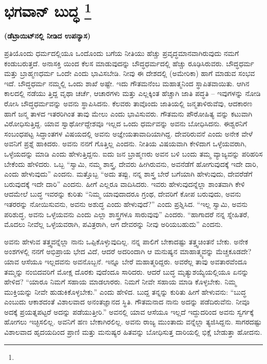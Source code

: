 
\chapter[ಭಗವಾನ್ ಬುದ್ಧ ]{ಭಗವಾನ್ ಬುದ್ಧ \protect\footnote{}}

\centerline{\textbf{(ಡೆಟ್ರಾಯಿಟ್​ನಲ್ಲಿ ನೀಡಿದ ಉಪನ್ಯಾಸ)}}

ಪ್ರತಿಯೊಂದು ಧರ್ಮದಲ್ಲಿಯೂ ಒಂದೊಂದು ಬಗೆಯ ನೀತಿಯು ಹೆಚ್ಚು ಪ್ರವೃದ್ಧಮಾನವಾಗಿರುವುದು ನಮಗೆ ಕಂಡುಬರುತ್ತದೆ. ಅನಾಸಕ್ತಿ ಯಿಂದ ಕೆಲಸ ಮಾಡುವುದನ್ನು ಬೌದ್ಧಧರ್ಮದಲ್ಲಿ ಹೆಚ್ಚು ರೂಢಿಸಿರುವರು. ಬೌದ್ಧಧರ್ಮ ಮತ್ತು ಬ್ರಾಹ್ಮಣಧರ್ಮ ಒಂದೇ ಎಂದು ಭಾವಿಸಬೇಡಿ. ನೀವು ಈ ದೇಶದಲ್ಲಿ (ಅಮೇರಿಕಾ) ಹಾಗೆ ಮಾಡುವ ಸಂಭವ ಇದೆ. ಬೌದ್ಧಧರ್ಮ ನಮ್ಮಲ್ಲಿ ಒಂದು ಶಾಖೆ ಅಷ್ಟೇ. ಇದು ಗೌತಮನೆಂಬ ಮಹಾತ್ಮನಿಂದ ಸ್ಥಾಪಿತವಾಯಿತು. ಆಗಿನ ಕಾಲದಲ್ಲಿ ನಡೆಯು ತ್ತಿದ್ದ ವೃಥಾ ಚರ್ಚೆ, ಆಚಾರಗಳು ಮತ್ತು ಎಲ್ಲಕ್ಕಿಂತ ಹೆಚ್ಚಾಗಿ ಜಾತಿ ಪದ್ಧತಿ – ಇವುಗಳನ್ನು ನೋಡಿ ರೋಸಿ ಬೌದ್ಧಧರ್ಮವನ್ನು ಅವನು ಸ್ಥಾಪಿಸಿದನು. ಕೆಲವರು ತಾವೊಂದು ಜಾತಿಯಲ್ಲಿ ಜನ್ಮತಾಳಿರುವೆವು, ಆದಕಾರಣ ಹಾಗೆ ಜನ್ಮ ತಾಳದ ಇತರರಿಗಿಂತ ತಾವು ಮೇಲು ಎಂದು ಭಾವಿಸುವರು. ಗೌತಮನು ಪೌರೋಹಿತ್ಯ ವನ್ನು ಕಟುವಾಗಿ ವಿರೋಧಿಸುತ್ತಿದ್ದ. ಯಾವ ಸ್ವಾರ್ಥೋದ್ದೇಶವೂ ಇಲ್ಲದ ಒಂದು ಧರ್ಮವನ್ನು ಅವನು ಬೋಧಿಸಿದನು. ಈಶ್ವರನಿಗೆ ಸಂಬಂಧಪಟ್ಟ ಸಿದ್ಧಾಂತಗಳ ವಿಷಯದಲ್ಲಿ ಅವನು ಅಜ್ಞೇಯತಾವಾದಿಯಾಗಿದ್ದ. ದೇವರಿರುವನೆ ಎಂದು ಅನೇಕ ವೇಳೆ ಅವನಿಗೆ ಪ್ರಶ್ನೆ ಹಾಕಿದರು. ಅವನು ನನಗೆ ಗೊತ್ತಿಲ್ಲ ಎಂದನು. ನೀತಿಯ ವಿಷಯವಾಗಿ ಕೇಳಿದಾಗ ಒಳ್ಳೆಯವರಾಗಿ, ಒಳ್ಳೆಯದನ್ನು ಮಾಡಿ ಎಂದು ಹೇಳುತ್ತಿದ್ದನು. ಐದು ಜನ ಬ್ರಾಹ್ಮಣರು ಅವನ ಬಳಿ ಬಂದು ತಮ್ಮ ವ್ಯಾಜ್ಯವನ್ನು ಪರಿಹರಿಸ ಬೇಕೆಂದು ಹೇಳಿದರು. ಒಬ್ಬ “ಸ್ವಾಮಿ, ನಮ್ಮ ಶಾಸ್ತ್ರ, ದೇವರು ಹೀಗಿರುವನು, ಅವನೆಡೆಗೆ ಹೋಗುವುದಕ್ಕೆ ಇದೇ ದಾರಿ, ಎಂದು ಹೇಳುವುದು” ಎಂದನು. ಮತ್ತೊಬ್ಬ “ಅದು ತಪ್ಪು, ನನ್ನ ಶಾಸ್ತ್ರ ಬೇರೆ ಬಗೆಯಾಗಿ ಹೇಳುವುದು, ದೇವರೆಡೆಗೆ ಬರುವುದಕ್ಕೆ ಇದೇ ದಾರಿ” ಎಂದನು. ಹೀಗೆ ಎಲ್ಲರೂ ವಾದಿಸಿದರು. ಇವರು ಹೇಳುವುದನ್ನೆಲ್ಲಾ ಶಾಂತವಾಗಿ ಕೇಳಿ ಆದಮೇಲೆ ಬುದ್ಧ ಇವರನ್ನು ಕುರಿತು “ನಿಮ್ಮ ಯಾವುದಾದರೂ ಗ್ರಂಥ, ದೇವರಿಗೆ ಕೋಪ ಬರುವುದು, ಅವನು ಇತರರನ್ನು ನೋಯಿಸುವನು, ಅವನು ಅಶುದ್ಧ ಎಂದು ಹೇಳುವುದೆ?” ಎಂದು ಪ್ರಶ್ನಿಸಿದ. “ಇಲ್ಲ ಸ್ವಾಮಿ, ಅವನು ಪರಿಶುದ್ಧ, ಅವನು ಒಳ್ಳೆಯವನು ಎಂದು ಎಲ್ಲಾ ಶಾಸ್ತ್ರಗಳೂ ಸಾರುವುವು” ಎಂದರು. “ಹಾಗಾದರೆ ನನ್ನ ಸ್ನೇಹಿತರೆ, ಮೊದಲು ನೀವೆಲ್ಲ ಒಳ್ಳೆಯವರಾಗಿ, ಪವಿತ್ರರಾಗಿ, ಆಗ ದೇವರನ್ನು ನೀವು ಅರಿಯಬಹುದು” ಎಂದನು.

ಅವನು ಹೇಳುವ ತತ್ತ್ವವನ್ನೆಲ್ಲಾ ನಾನು ಒಪ್ಪಿಕೊಳ್ಳುವುದಿಲ್ಲ. ನನ್ನ ಪಾಲಿಗೆ ಬೇಕಾದಷ್ಟು ತತ್ತ್ವಚಿಂತನೆ ಬೇಕು. ಅನೇಕ ಅಂಶಗಳಲ್ಲಿ ನನಗೆ ಅಭಿಪ್ರಾಯ ಭೇದ ವಿದೆ, ಆದರೆ ಅದರಿಂದಾಗಿ ಆ ಮನುಷ್ಯನ ಮಾಹಾತ್ಮ್ಯವನ್ನು ಮೆಚ್ಚಕೂಡದೇ? ಯಾವ ಆಸೆಯೂ ಇಲ್ಲದವನು ಅವನೊಬ್ಬನೆ. ಇನ್ನೂ ಬೇರೆ ಮಹಾತ್ಮರಿದ್ದರು. ಅವರೆಲ್ಲ ತಾವು ಅವತಾರವೆಂದೂ ತಮ್ಮನ್ನು ನಂಬಿದವರಿಗೆ ಮೋಕ್ಷ ದೊರಕು ವುದೆಂದೂ ಸಾರಿದರು. ಆದರೆ ಬುದ್ಧ ಮೃತ್ಯುಶಯ್ಯೆಯಲ್ಲಿಯೂ ಏನನ್ನು ಹೇಳಿದ? “ಯಾರೂ ನಿಮಗೆ ಸಹಾಯ ಮಾಡಲಾರರು. ನಿಮಗೆ ನೀವೇ ಸಹಾಯ ಮಾಡಿ ಕೊಳ್ಳಬೇಕು. ನಿಮ್ಮ ಮುಕ್ತಿಯನ್ನು ನೀವೇ ಹುಡುಕಿಕೊಳ್ಳಬೇಕು.” ಎಂದು ಹೇಳಿದ. ಬುದ್ದ ತನ್ನನ್ನು ಕುರಿತು ಹೀಗೆ ಹೇಳುವನು: “ಬುದ್ಧ ಎಂಬುದು ಆಕಾಶದಂತೆ ವಿಶಾಲವಾದ ಅನಂತಜ್ಞಾನದ ಸ್ಥಿತಿ. ಗೌತಮನಾದ ನಾನು ಅದನ್ನು ಪಡೆದಿರುವೆನು. ನೀವೂ ಅದಕ್ಕೆ ಪ್ರಯತ್ನಪಟ್ಟರೆ ಅದನ್ನು ಪಡೆಯುತ್ತೀರಿ.” ಅವನಲ್ಲಿ ಯಾವ ಆಸೆಯೂ ಇಲ್ಲದೆ ಇದ್ದುದರಿಂದ ಅವನು ಸ್ವರ್ಗಕ್ಕೆ ಹೋಗಲು ಇಚ್ಛಿಸಲಿಲ್ಲ. ಅವನಿಗೆ ಹಣ ಬೇಕಾಗಿರಲಿಲ್ಲ. ಅವನು ರಾಜ್ಯ ಮುಂತಾದು ವನ್ನೆಲ್ಲಾ ತ್ಯಜಿಸಿದ್ದನು. ಸಾಗರದಷ್ಟು ವಿಶಾಲವಾದ ಹೃದಯದಿಂದ ಪ್ರಾಣಿ ಮತ್ತು ಮನುಷ್ಯರ ಹಿತವನ್ನು ಬೋಧಿಸುತ್ತ ದಾರಿಯಲ್ಲಿ ಭಿಕ್ಷೆ ಬೇಡುತ್ತಾ ಹೋದನು.


